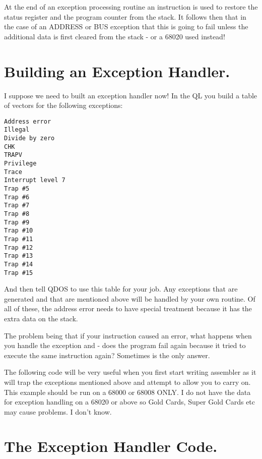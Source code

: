 At the end of an exception processing routine an  instruction is
    used to restore the status register and the program counter from the
    stack. It follows then that in the case of an ADDRESS or BUS exception
    that this is going to fail unless the additional data is first cleared
    from the stack -{} or a 68020 used instead!

\section{Building an Exception Handler.}
\label{ch6-exception-handler}%

I suppose we need to built an exception handler now! In the QL you
    build a table of vectors for the following exceptions:

\begin{lstlisting}[firstnumber=1,frame=none,numbers=none,language={}]
Address error 
Illegal 
Divide by zero 
CHK 
TRAPV 
Privilege 
Trace 
Interrupt level 7 
Trap #5 
Trap #6 
Trap #7 
Trap #8 
Trap #9 
Trap #10 
Trap #11 
Trap #12 
Trap #13 
Trap #14 
Trap #15
\end{lstlisting}

And then tell QDOS to use this table for your job. Any exceptions
    that are generated and that are mentioned above will be handled by your
    own routine. Of all of these, the address error needs to have special
    treatment because it has the extra data on the stack.

The problem being that if your instruction caused an error, what
    happens when you handle the exception and  -{} does the program fail
    again because it tried to execute the same instruction again? Sometimes
    is the only answer.

The following code will be very useful when you first start writing
    assembler as it will trap the exceptions mentioned above and attempt to
    allow you to carry on. This example should be run on a 68000 or 68008
    ONLY. I do not have the data for exception handling on a 68020 or above so
    Gold Cards, Super Gold Cards etc may cause problems. I don't know.

\section{The Exception Handler Code.}
\label{ch6-handler-code}%

